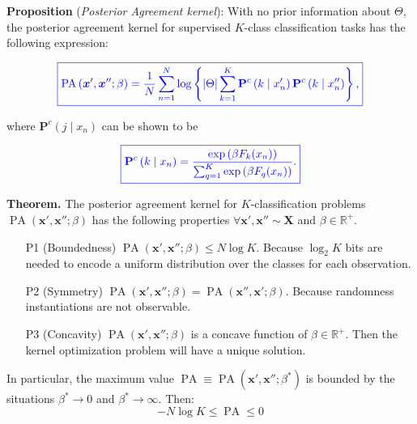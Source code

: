 \begin{frame}
    \textbf{Proposition} (\textit{Posterior Agreement kernel}): With no prior information about $\Theta$, the posterior agreement kernel
    for supervised $K$-class classification tasks has the following expression:

    $$
    \textcolor{blue}{
        \boxed{
            \operatorname{PA}\left(\bm{x}', \bm{x}'' ; \beta\right)=\frac{1}{N} \sum_{n=1}^N \log \left\{|\Theta| \sum_{k= 1}^K \mathbf{P}^c\left(k \mid x_n' \right) \mathbf{P}^c \left( k \mid x_n'' \right)\right\},
        }
    }
    $$

	\vspace{0.5cm}

    where $\mathbf{P}^c(j \mid x_n)$ can be shown to be

    $$
    \textcolor{blue}{
        \boxed{
            \mathbf{P}^c\left(k \mid x_n\right)=\frac{\exp\left(\beta F_{k}(x_n)\right)}{\sum_{q=1}^K\exp\left(\beta F_q(x_n)\right)}.
        }
    }
    $$
\end{frame}


\begin{frame}
	\textbf{Theorem.} The posterior agreement kernel for $K$-classification 
	problems $\operatorname{PA}\left(\bm{x}', \bm{x}'' ; \beta\right)$ has the following 
	properties $\forall \bm{x}', \bm{x}'' \sim \bm{X}$ and $\beta \in \mathbb{R}^+$.

	\vspace{0.15cm}

    \begin{itemize}
        \item[P1](Boundedness) $\operatorname{PA}\left(\bm{x}', \bm{x}'' ; \beta\right) \leq N \log{K}$. Because $\log_2 K$ bits are 
		needed to encode a uniform distribution over the classes for each observation.
        \item[P2](Symmetry)  $\operatorname{PA}\left(\bm{x}', \bm{x}'' ; \beta\right) = \operatorname{PA}\left(\bm{x}'', \bm{x}'; \beta\right)$. 
		Because randomness instantiations are not observable.
        \item[P3](Concavity) $\operatorname{PA}\left(\bm{x}', \bm{x}'' ; \beta\right)$ is a concave function of $\beta \in \mathbb{R}^+$. 
		Then the kernel optimization problem will have a unique solution.
    \end{itemize}

	\vspace{0.5cm}
	
	In particular, the maximum value  $\operatorname{PA} \equiv \operatorname{PA}\left(\bm{x}', \bm{x}'' ; \beta^{*} \right)$ is bounded by
	the situations $\beta^{*} \longrightarrow 0$ and $\beta^{*} \longrightarrow \infty$. Then:
	$$
    -N \log K \leq \operatorname{PA} \leq 0
    $$


	
\end{frame}

